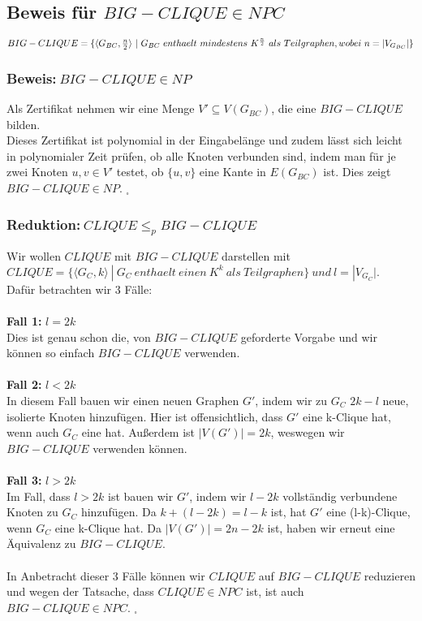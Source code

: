 \subsection*{Beweis für $BIG-CLIQUE \in NPC$}
$BIG-CLIQUE =\\ \{\langle G_{BC},\frac{n}{2}\rangle\ |\ G_{BC}\ enthaelt\ mindestens\ K^{\frac{n}{2}}\ als\ Teilgraphen, wobei\ n=|V_{G_{BC}}|\}$

\subsubsection*{Beweis:$\ BIG-CLIQUE \in NP$}
Als Zertifikat nehmen wir eine Menge $V' \subseteq V(G_{BC})$, die eine $BIG-CLIQUE$ bilden.\\
Dieses Zertifikat ist polynomial in der Eingabelänge und zudem lässt sich leicht in polynomialer Zeit prüfen, ob alle Knoten verbunden sind, indem man für je zwei Knoten $u, v \in V'$ testet, ob $\{u,v\}$ eine Kante in $E(G_{BC})$ ist. Dies zeigt $BIG-CLIQUE \in NP$. $ _\square$

\subsubsection*{Reduktion:$\ CLIQUE \leq_p BIG-CLIQUE$}
Wir wollen $CLIQUE$ mit $BIG-CLIQUE$ darstellen mit $CLIQUE = \{\langle G_C, k\rangle\ |\ G_C\ enthaelt\ einen\ K^k\ als\ Teilgraphen\}\ und\ l = |V_{G_C}|.$\\
Dafür betrachten wir 3 Fälle:\\\\
\textbf{Fall 1:} $l = 2k$\\
Dies ist genau schon die, von $BIG-CLIQUE$ geforderte Vorgabe und wir können so einfach $BIG-CLIQUE$ verwenden.\\\\
\textbf{Fall 2:} $l < 2k$\\
In diesem Fall bauen wir einen neuen Graphen $G'$, indem wir zu $G_C$ $2k - l$ neue, isolierte Knoten hinzufügen. Hier ist offensichtlich, dass $G'$ eine k-Clique hat, wenn auch $G_C$ eine hat. Außerdem ist $|V(G')| = 2k$, weswegen wir $BIG-CLIQUE$ verwenden können.\\\\
\textbf{Fall 3:} $l > 2k$\\
Im Fall, dass $l > 2k$ ist bauen wir $G'$, indem wir $l - 2k$ vollständig verbundene Knoten zu $G_C$ hinzufügen. Da $k + (l -2k) = l - k$ ist, hat $G'$ eine (l-k)-Clique, wenn $G_C$ eine k-Clique hat. Da $|V(G')| = 2n - 2k$ ist, haben wir erneut eine Äquivalenz zu $BIG-CLIQUE$.\\\\
In Anbetracht dieser 3 Fälle können wir $CLIQUE$ auf $BIG-CLIQUE$ reduzieren und wegen der Tatsache, dass $CLIQUE \in NPC$ ist, ist auch $BIG-CLIQUE \in NPC$. $ _\square$